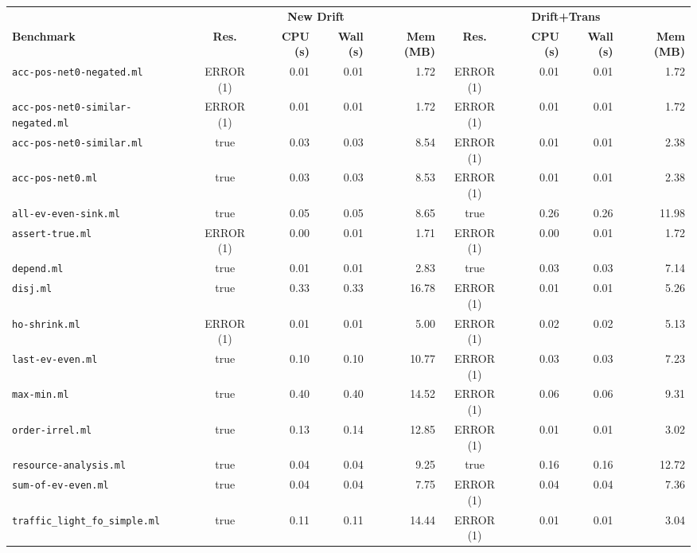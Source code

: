 \begin{tabular}{|l|c|rrr|c|rrr|}
\hline
                & \multicolumn{4}{c|}{\bf New Drift} & \multicolumn{4}{c|}{\bf Drift+Trans} \\
{\bf Benchmark} & {\bf Res.} & {\bf CPU (s)} & {\bf Wall (s)} & {\bf Mem (MB)} & {\bf Res.} & {\bf CPU (s)} & {\bf Wall (s)} & {\bf Mem (MB)} \\
\hline
\hline
\texttt{acc-pos-net0-negated.ml} & ERROR (1) & 0.01 & 0.01 & 1.72 & ERROR (1) & 0.01 & 0.01 & 1.72 \\
\hline
\texttt{acc-pos-net0-similar-negated.ml} & ERROR (1) & 0.01 & 0.01 & 1.72 & ERROR (1) & 0.01 & 0.01 & 1.72 \\
\hline
\texttt{acc-pos-net0-similar.ml} & true     & 0.03 & 0.03 & 8.54 & ERROR (1) & 0.01 & 0.01 & 2.38 \\
\hline
\texttt{acc-pos-net0.ml}     & true     & 0.03 & 0.03 & 8.53 & ERROR (1) & 0.01 & 0.01 & 2.38 \\
\hline
\texttt{all-ev-even-sink.ml} & true     & 0.05 & 0.05 & 8.65 & true     & 0.26 & 0.26 & 11.98 \\
\hline
\texttt{assert-true.ml}      & ERROR (1) & 0.00 & 0.01 & 1.71 & ERROR (1) & 0.00 & 0.01 & 1.72 \\
\hline
\texttt{depend.ml}           & true     & 0.01 & 0.01 & 2.83 & true     & 0.03 & 0.03 & 7.14 \\
\hline
\texttt{disj.ml}             & true     & 0.33 & 0.33 & 16.78 & ERROR (1) & 0.01 & 0.01 & 5.26 \\
\hline
\texttt{ho-shrink.ml}        & ERROR (1) & 0.01 & 0.01 & 5.00 & ERROR (1) & 0.02 & 0.02 & 5.13 \\
\hline
\texttt{last-ev-even.ml}     & true     & 0.10 & 0.10 & 10.77 & ERROR (1) & 0.03 & 0.03 & 7.23 \\
\hline
\texttt{max-min.ml}          & true     & 0.40 & 0.40 & 14.52 & ERROR (1) & 0.06 & 0.06 & 9.31 \\
\hline
\texttt{order-irrel.ml}      & true     & 0.13 & 0.14 & 12.85 & ERROR (1) & 0.01 & 0.01 & 3.02 \\
\hline
\texttt{resource-analysis.ml} & true     & 0.04 & 0.04 & 9.25 & true     & 0.16 & 0.16 & 12.72 \\
\hline
\texttt{sum-of-ev-even.ml}   & true     & 0.04 & 0.04 & 7.75 & ERROR (1) & 0.04 & 0.04 & 7.36 \\
\hline
\texttt{traffic\_light\_fo\_simple.ml} & true     & 0.11 & 0.11 & 14.44 & ERROR (1) & 0.01 & 0.01 & 3.04 \\
\hline
\end{tabular}
